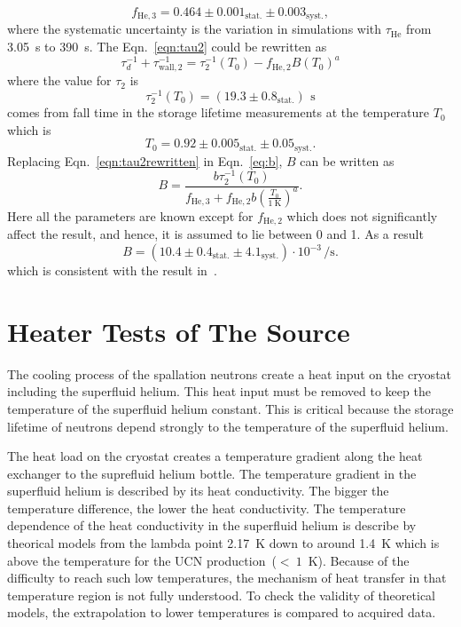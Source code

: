 \begin{equation}
f_\mathrm{He,3} = 0.464 \pm 0.001_\mathrm{stat.} \pm 0.003_\mathrm{syst.},
\end{equation}
where the systematic uncertainty is the variation in simulations with
$\tau_{\mathrm{He}}$ from 3.05~s to 390~s. 
The Eqn.~\ref{eqn:tau2} could be rewritten as
\begin{equation}
  \label{eqn:tau2rewritten}
\tau_d^{-1} + \tau_\mathrm{wall,2}^{-1} = \tau_2^{-1}(T_0) - f_\mathrm{He,2} B \left( T_0 \right)^a
\end{equation}
where the value for $\tau_2$ is
\begin{equation}
\tau_2^{-1}(T_0) = (19.3 \pm 0.8_\mathrm{stat.})\,~\si{\second}
\end{equation}
comes from fall time in the storage lifetime measurements at the
temperature $T_0$ which is
\begin{equation}
T_0 = 0.92 \pm 0.005_\mathrm{stat.} \pm 0.05_\mathrm{syst.}.
\end{equation}
Replacing Eqn.~\ref{eqn:tau2rewritten} in Eqn.~\ref{eq:b}, $B$ can be written as
\begin{equation}
B = \frac{b \tau_2^{-1}(T_0)}{f_\mathrm{He,3} + f_\mathrm{He,2} b \left( \frac{T_0}{\SI{1}{\kelvin}} \right)^a}.
\end{equation}
Here all the parameters are known except for $ f_\mathrm{He,2}$ which
does not significantly affect the result, and hence, it is assumed to
lie between 0 and 1. As a result
\begin{equation}
B = (10.4 \pm 0.4_\mathrm{stat.} \pm 4.1_\mathrm{syst.}) \cdot 10^{-3} \, \si{\per\second}.
\end{equation}
which is consistent with the result in~\cite{Leung2016}.




\section{Heater Tests of The Source}
The cooling process of the spallation neutrons create a heat input on
the cryostat including the superfluid helium. This heat input must be
removed to keep the temperature of the superfluid helium
constant. This is critical because the storage lifetime of neutrons
depend strongly to the temperature of the superfluid helium.

The heat load on the cryostat creates a temperature gradient along the
heat exchanger to the suprefluid helium bottle. The temperature
gradient in the superfluid helium is described by its heat
conductivity. The bigger the temperature difference, the lower the
heat conductivity. The temperature dependence of the heat conductivity
in the superfluid helium is describe by theorical models from the
lambda point 2.17~K down to around 1.4~K which is above the
temperature for the UCN production~($<~1$~K).  Because of the
difficulty to reach such low temperatures, the mechanism of heat
transfer in that temperature region is not fully understood.  To check
the validity of theoretical models, the extrapolation to lower
temperatures is compared to acquired data.



